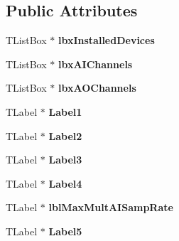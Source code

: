 \subsection*{Public Attributes}
\begin{DoxyCompactItemize}
\item 
\hypertarget{class_t_device_desc_a859062dd11fc97a57c0a56cd1e16d501}{T\+List\+Box $\ast$ {\bfseries lbx\+Installed\+Devices}}\label{class_t_device_desc_a859062dd11fc97a57c0a56cd1e16d501}

\item 
\hypertarget{class_t_device_desc_a739a45e4a6f2fa316f26e39634731b87}{T\+List\+Box $\ast$ {\bfseries lbx\+A\+I\+Channels}}\label{class_t_device_desc_a739a45e4a6f2fa316f26e39634731b87}

\item 
\hypertarget{class_t_device_desc_a0bb71d1c106335acd61090af71f2d1f8}{T\+List\+Box $\ast$ {\bfseries lbx\+A\+O\+Channels}}\label{class_t_device_desc_a0bb71d1c106335acd61090af71f2d1f8}

\item 
\hypertarget{class_t_device_desc_afd86ffcb908a7de7a9677f3ee2826eaa}{T\+Label $\ast$ {\bfseries Label1}}\label{class_t_device_desc_afd86ffcb908a7de7a9677f3ee2826eaa}

\item 
\hypertarget{class_t_device_desc_a6ec49af840ca5866d297eeb226d32b7e}{T\+Label $\ast$ {\bfseries Label2}}\label{class_t_device_desc_a6ec49af840ca5866d297eeb226d32b7e}

\item 
\hypertarget{class_t_device_desc_a1500472b07f3ae83b2d122f96fabf5d7}{T\+Label $\ast$ {\bfseries Label3}}\label{class_t_device_desc_a1500472b07f3ae83b2d122f96fabf5d7}

\item 
\hypertarget{class_t_device_desc_a8ff89efbb70fa5b6716b25167b0971d6}{T\+Label $\ast$ {\bfseries Label4}}\label{class_t_device_desc_a8ff89efbb70fa5b6716b25167b0971d6}

\item 
\hypertarget{class_t_device_desc_ac14958676932a474afa2dde4c4b61ab9}{T\+Label $\ast$ {\bfseries lbl\+Max\+Mult\+A\+I\+Samp\+Rate}}\label{class_t_device_desc_ac14958676932a474afa2dde4c4b61ab9}

\item 
\hypertarget{class_t_device_desc_ac92d40a34a73c39e215ed0dd5719e643}{T\+Label $\ast$ {\bfseries Label5}}\label{class_t_device_desc_ac92d40a34a73c39e215ed0dd5719e643}


\end{DoxyCompactItemize}
